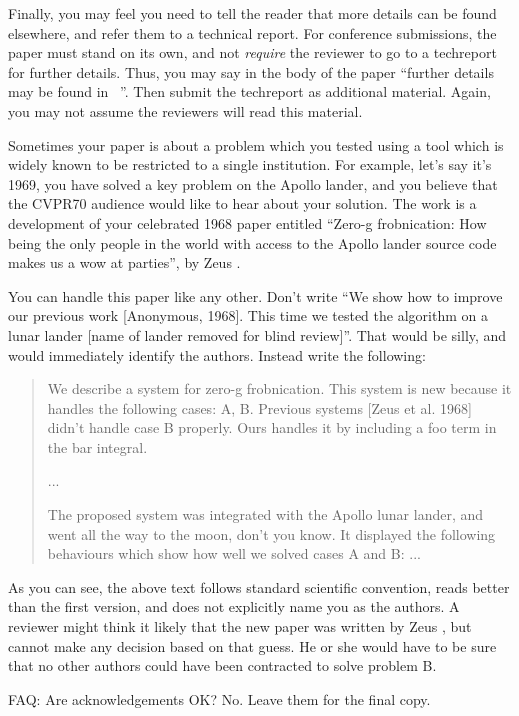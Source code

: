 \documentclass[10pt,twocolumn,letterpaper]{article}
\begin{document}
Finally, you may feel you need to tell the reader that more details can be
found elsewhere, and refer them to a technical report.  For conference
submissions, the paper must stand on its own, and not {\em require} the
reviewer to go to a techreport for further details.  Thus, you may say in
the body of the paper ``further details may be found
in~ ''.  Then submit the techreport as additional material.
Again, you may not assume the reviewers will read this material. 

Sometimes your paper is about a problem which you tested using a tool which
is widely known to be restricted to a single institution.  For example,
let's say it's 1969, you have solved a key problem on the Apollo lander,
and you believe that the CVPR70 audience would like to hear about your
solution.  The work is a development of your celebrated 1968 paper entitled
``Zero-g frobnication: How being the only people in the world with access to
the Apollo lander source code makes us a wow at parties'', by Zeus \etal.

You can handle this paper like any other.  Don't write ``We show how to
improve our previous work [Anonymous, 1968].  This time we tested the
algorithm on a lunar lander [name of lander removed for blind review]''.
That would be silly, and would immediately identify the authors. Instead
write the following:
\begin{quotation}
\noindent
   We describe a system for zero-g frobnication.  This
   system is new because it handles the following cases:
   A, B.  Previous systems [Zeus et al. 1968] didn't
   handle case B properly.  Ours handles it by including
   a foo term in the bar integral.

   ...

   The proposed system was integrated with the Apollo
   lunar lander, and went all the way to the moon, don't
   you know.  It displayed the following behaviours
   which show how well we solved cases A and B: ...
\end{quotation}
As you can see, the above text follows standard scientific convention,
reads better than the first version, and does not explicitly name you as
the authors.  A reviewer might think it likely that the new paper was
written by Zeus \etal, but cannot make any decision based on that guess.
He or she would have to be sure that no other authors could have been
contracted to solve problem B.

FAQ: Are acknowledgements OK?  No.  Leave them for the final copy.
\end{document}

